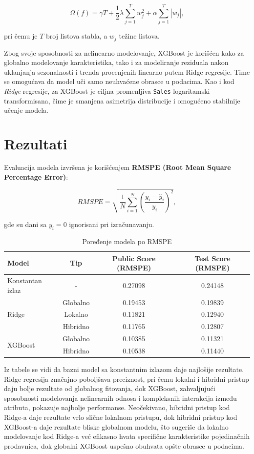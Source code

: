 \documentclass[12pt]{article}
\begin{document}
\begin{equation}
    \Omega(f) = \gamma T + \frac{1}{2}\lambda \sum_{j=1}^{T} w_j^2 + \alpha \sum_{j=1}^{T} |w_j|,
\end{equation}

pri čemu je \(T\) broj listova stabla, a \(w_j\) težine listova.  


Zbog svoje sposobnosti za nelinearno modelovanje, XGBoost je korišćen kako za globalno modelovanje karakteristika, tako i za modeliranje reziduala nakon uklanjanja sezonalnosti i trenda procenjenih linearno putem Ridge regresije. Time se omogućava da model uči samo neuhvaćene obrasce u podacima.
Kao i kod \textit{Ridge} regresije, za XGBoost je ciljna promenljiva \texttt{Sales} logaritamski transformisana, čime je smanjena asimetrija distribucije i omogućeno stabilnije učenje modela.


\newpage


\section{Rezultati}

Evaluacija modela izvršena je korišćenjem \textbf{RMSPE (Root Mean Square Percentage Error)}:

\begin{equation}
    RMSPE = \sqrt{\frac{1}{N}\sum_{i=1}^{N} \left( \frac{y_i - \hat{y}_i}{y_i} \right)^2 },
\end{equation}

gde su dani sa $y_i = 0$ ignorisani pri izračunavanju.

\begin{table}[H]
\centering
\caption{Poređenje modela po RMSPE}
\begin{tabular}{|l|c|c|c|} %
\hline
Model & Tip & Public Score (RMSPE) & Test Score (RMSPE) \\
\hline
Konstantan izlaz & - & 0.27098 & 0.24148 \\
\hline
\multirow{3}{*}{Ridge} 
    & Globalno & 0.19453 & 0.19839 \\ \cline{2-4}
    & Lokalno & 0.11821 & 0.12940 \\ \cline{2-4}
    & Hibridno & 0.11765 & 0.12807 \\
\hline
\multirow{2}{*}{XGBoost} 
    & Globalno & 0.10385 & 0.11321 \\ \cline{2-4}
    & Hibridno & 0.10538 & 0.11440 \\
\hline
\end{tabular}
\end{table}
Iz tabele se vidi da bazni model sa konstantnim izlazom daje najlošije rezultate. Ridge regresija značajno poboljšava preciznost, pri čemu lokalni i hibridni pristup daju bolje rezultate od globalnog fitovanja, dok XGBoost, zahvaljujući sposobnosti modelovanja nelinearnih odnosa i kompleksnih interakcija između atributa, pokazuje najbolje performanse. Neočekivano, hibridni pristup kod Ridge-a daje rezultate vrlo slične lokalnom pristupu, dok hibridni pristup kod XGBoost-a daje rezultate bliske globalnom modelu, što sugeriše da lokalno modelovanje kod Ridge-a već efikasno hvata specifične karakteristike pojedinačnih prodavnica, dok globalni XGBoost uspešno obuhvata opšte obrasce u podacima.
\end{document}
